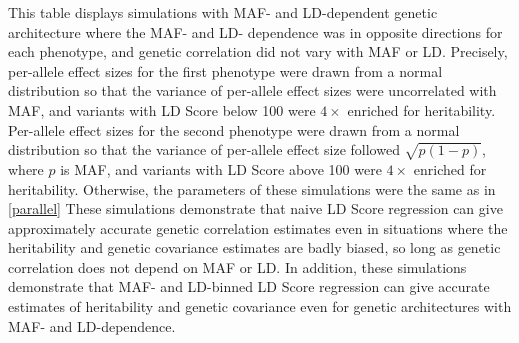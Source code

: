 This table displays simulations with MAF- and LD-dependent genetic architecture where the MAF- and LD- dependence was in opposite directions for each phenotype, and genetic correlation did not vary with MAF or LD. Precisely, per-allele effect sizes for the first phenotype were drawn from a normal distribution so that the variance of per-allele effect sizes were uncorrelated with MAF, and variants with LD Score below 100 were $4\times$ enriched for heritability. Per-allele effect sizes for the second phenotype were drawn from a normal distribution so that the variance of per-allele effect size followed $\sqrt{p(1-p)}$, where $p$ is MAF, and variants with LD Score above 100 were $4\times$ enriched for heritability. Otherwise, the parameters of these simulations were the same as in \ref{parallel}
These simulations demonstrate that naive LD Score regression can give approximately accurate genetic correlation estimates even in situations where the heritability and genetic covariance estimates are badly biased, so long as genetic correlation does not depend on MAF or LD. In addition, these simulations demonstrate that MAF- and LD-binned LD Score regression can give accurate estimates of heritability and genetic covariance even for genetic architectures with MAF- and LD-dependence.